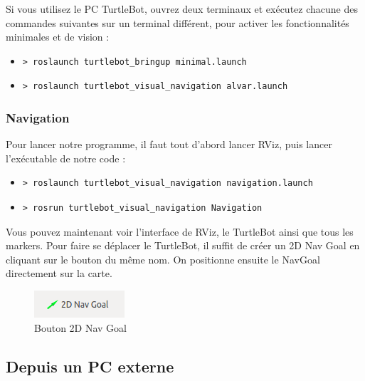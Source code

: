 \documentclass[10pt,a4paper]{article}
\begin{document}
Si vous utilisez le PC TurtleBot, ouvrez deux terminaux et exécutez chacune des commandes suivantes sur un terminal différent, pour activer les fonctionnalités minimales et de vision :

\begin{itemize}
\item[]  \begin{verbatim}> roslaunch turtlebot_bringup minimal.launch \end{verbatim}
\item[]  \begin{verbatim}> roslaunch turtlebot_visual_navigation alvar.launch \end{verbatim}
\end{itemize}

\subsubsection{Navigation}
\label{sec:navigation}

Pour lancer notre programme, il faut tout d'abord lancer RViz, puis lancer l'exécutable de notre code :

\begin{itemize}
\item[] \begin{verbatim}> roslaunch turtlebot_visual_navigation navigation.launch \end{verbatim}
\item[]  \begin{verbatim}> rosrun turtlebot_visual_navigation Navigation \end{verbatim}
\end{itemize}

Vous pouvez maintenant voir l'interface de RViz, le TurtleBot ainsi que tous les markers.
Pour faire se déplacer le TurtleBot, il suffit de créer un 2D Nav Goal en cliquant sur le bouton du même nom. On positionne ensuite le NavGoal directement sur la carte.\\
\begin{figure}
 \center
 \includegraphics[scale=0.5]{2DNavGoal.png}
 \caption{Bouton 2D Nav Goal}
\end{figure}


\subsection{Depuis un PC externe}
\end{document}
